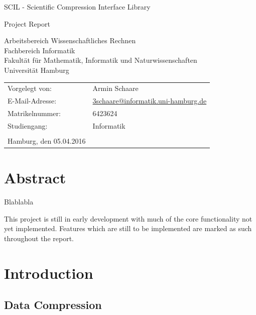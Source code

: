\documentclass[
	12pt,
	a4paper,
	BCOR10mm,
	DIV14,
	headsepline,
]{scrreprt}
\begin{document}
\begin{titlepage}
	\begin{center}
		{\titlefont\huge SCIL - Scientific Compression Interface Library\par}

		\bigskip
		\bigskip

		{\Large Project Report\par}

		\bigskip
		\bigskip

		{\large Arbeitsbereich Wissenschaftliches Rechnen\\
		Fachbereich Informatik\\
		Fakultät für Mathematik, Informatik und Naturwissenschaften\\
		Universität Hamburg\par}
	\end{center}

	\vfill

	{\large\begin{tabular}{ll}
		Vorgelegt von:  & Armin Schaare \\
		E-Mail-Adresse: & \href{mailto:adresse@email.de}{3schaare@informatik.uni-hamburg.de} \\
		Matrikelnummer: & 6423624 \\
		Studiengang:    & Informatik \\
		\\
		Hamburg, den 05.04.2016
	\end{tabular}\par}
\end{titlepage}

\chapter*{Abstract}

\thispagestyle{empty}


Blablabla \par
This project is still in early development with much of the core functionality
not yet implemented. Features which are still to be implemented are marked as
such throughout the report.

\tableofcontents

\chapter{Introduction}
\label{Introduction}

\section{Data Compression}
\end{document}

